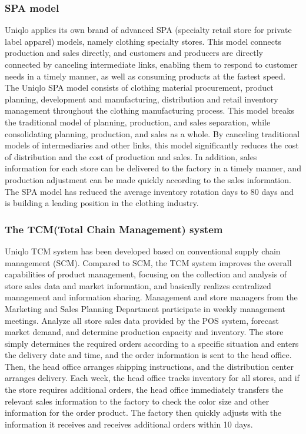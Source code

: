 \documentclass[12pt,a4paper]{article}
\begin{document}
\hypertarget{spa-model}{%
\subsubsection{SPA model}\label{spa-model}}

Uniqlo applies its own brand of advanced SPA (specialty retail store for
private label apparel) models, namely clothing specialty stores. This
model connects production and sales directly, and customers and
producers are directly connected by canceling intermediate links,
enabling them to respond to customer needs in a timely manner, as well
as consuming products at the fastest speed. The Uniqlo SPA model
consists of clothing material procurement, product planning, development
and manufacturing, distribution and retail inventory management
throughout the clothing manufacturing process. This model breaks the
traditional model of planning, production, and sales separation, while
consolidating planning, production, and sales as a whole. By canceling
traditional models of intermediaries and other links, this model
significantly reduces the cost of distribution and the cost of
production and sales. In addition, sales information for each store can
be delivered to the factory in a timely manner, and production
adjustment can be made quickly according to the sales information. The
SPA model has reduced the average inventory rotation days to 80 days and
is building a leading position in the clothing industry.

\hypertarget{the-tcmtotal-chain-management-system}{%
\subsubsection{The TCM(Total Chain Management)
system}\label{the-tcmtotal-chain-management-system}}

Uniqlo TCM system has been developed based on conventional supply chain
management (SCM). Compared to SCM, the TCM system improves the overall
capabilities of product management, focusing on the collection and
analysis of store sales data and market information, and basically
realizes centralized management and information sharing. Management and
store managers from the Marketing and Sales Planning Department
participate in weekly management meetings. Analyze all store sales data
provided by the POS system, forecast market demand, and determine
production capacity and inventory. The store simply determines the
required orders according to a specific situation and enters the
delivery date and time, and the order information is sent to the head
office. Then, the head office arranges shipping instructions, and the
distribution center arranges delivery. Each week, the head office tracks
inventory for all stores, and if the store requires additional orders,
the head office immediately transfers the relevant sales information to
the factory to check the color size and other information for the order
product. The factory then quickly adjusts with the information it
receives and receives additional orders within 10 days.
\end{document}

